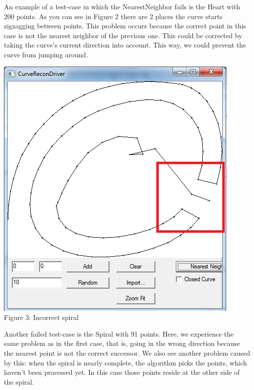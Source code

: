     \noindent An example of a test-case in which the NearestNeighbor fails is the Heart with 200 points. As you can see in Figure 2 there are 2 places the curve starts zigzagging between points.
    This problem occurs because the correct point in this case is not the nearest neighbor of the previous one. This could be corrected by taking the curve's current direction into account. This way, we could prevent the curve from jumping around.\\

    \begin{center}
      \includegraphics[scale = 0.6]{1NearestNeighbor/nnSpiralgraph.png}\\
      Figure 3: Incorrect spiral
    \end{center}

    \noindent Another failed test-case is the Spiral with 91 points. Here, we experience the same problem as in the first case, that is, going in the wrong direction because the nearest point is not the correct successor. We also see another problem caused by this: when the spiral is nearly complete, the algorithm picks the points, which haven't been processed yet. In this case those points reside at the other side of the spiral.\\

